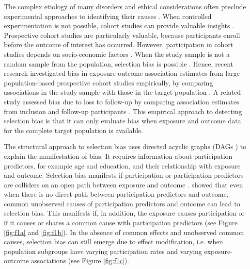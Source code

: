 \documentclass[12pt]{article}
\begin{document}
The complex etiology of many disorders and ethical considerations often preclude experimental approaches to identifying their causes \cite{Rothman2008-sq}. When controlled experimentation is not possible, cohort studies can provide valuable insights \cite{Greenland2017-qr}. Prospective cohort studies are particularly valuable, because participants enroll before the outcome of interest has occurred. However, participation in cohort studies depends on socio-economic factors \cite{Galea2007-hv}. When the study sample is not a random sample from the population, selection bias is possible \cite{Hernan2004-oz}. Hence, recent research investigated bias in exposure-outcome association estimates from large population-based prospective cohort studies empirically, by comparing associations in the study sample with those in the target population \cite{Nilsen2009-ci, Nohr2006-uf, Nohr2018-sn, Hatch2016-us}. A related study assessed bias due to loss to follow-up by comparing association estimates from inclusion and follow-up participants \cite{Greene2011-am}. This empirical approach to detecting selection bias is that it can only evaluate bias when exposure and outcome data for the complete target population is available.

The structural approach to selection bias uses directed acyclic graphs (DAGs \cite{Pearl1995-ss}) to explain the manifestation of bias. It requires information about participation predictors, for example age and education, and their relationship with exposure and outcome. Selection bias manifests if participation or participation predictors are colliders on an open path between exposure and outcome \cite{Cole2010-za}. \citeauthor{Hernan2004-oz} \cite{Hernan2004-oz} showed that even when there is no direct path between participation predictors and outcome, common unobserved causes of participation predictors and outcome can lead to selection bias. This manifests if, in addition, the exposure causes participation or if it causes or shares a common cause with participation predictors (see Figure \ref{fig:f1a} and \ref{fig:f1b}). In the absence of common effects and unobserved common causes, selection bias can still emerge due to effect modification, i.e. when population subgroups have varying participation rates and varying exposure-outcome associations (see Figure \ref{fig:f1c}).
\end{document}
